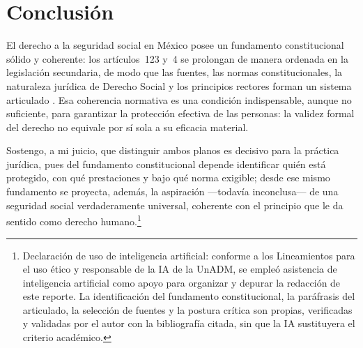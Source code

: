 \documentclass[12pt,letterpaper,oneside]{article}
\begin{document}
\section{Conclusi\'on}

El derecho a la seguridad social en M\'exico posee un fundamento constitucional s\'olido y coherente: los art\'iculos~123 y~4 se prolongan de manera ordenada en la legislaci\'on secundaria, de modo que las fuentes, las normas constitucionales, la naturaleza jur\'idica de Derecho Social y los principios rectores forman un sistema articulado \citep{cpeum2026,lss2026,lissste2026}. Esa coherencia normativa es una condici\'on indispensable, aunque no suficiente, para garantizar la protecci\'on efectiva de las personas: la validez formal del derecho no equivale por s\'i sola a su eficacia material.

Sostengo, a mi juicio, que distinguir ambos planos es decisivo para la pr\'actica jur\'idica, pues del fundamento constitucional depende identificar qui\'en est\'a protegido, con qu\'e prestaciones y bajo qu\'e norma exigible; desde ese mismo fundamento se proyecta, adem\'as, la aspiraci\'on —todav\'ia inconclusa— de una seguridad social verdaderamente universal, coherente con el principio que le da sentido como derecho humano.\footnote{Declaraci\'on de uso de inteligencia artificial: conforme a los Lineamientos para el uso \'etico y responsable de la IA de la UnADM, se emple\'o asistencia de inteligencia artificial como apoyo para organizar y depurar la redacci\'on de este reporte. La identificaci\'on del fundamento constitucional, la par\'afrasis del articulado, la selecci\'on de fuentes y la postura cr\'itica son propias, verificadas y validadas por el autor con la bibliograf\'ia citada, sin que la IA sustituyera el criterio acad\'emico.}

\clearpage
\nocite{cpeum2026,lss2026,lissste2026,lissfam2026,bricenoRuiz2011,gonzalezCarvallo2024,ibarraOlguin2022,hernandezInclusion2020,belmontLugoParra2017,moralesFajardo2021,acnudhSeguridadSocial2026}

\end{document}
